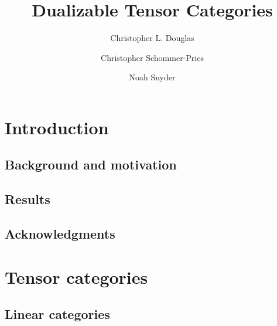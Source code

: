 \documentclass{amsart}
\begin{document}
\title{Dualizable Tensor Categories}

\begin{abstract}

\end{abstract}
	
\author{Christopher L. Douglas}
\address{Department of Mathematics, University of California, Berkeley, CA 94720, USA}
	
\author{Christopher Schommer-Pries}
\address{Department of Mathematics \\
} %

\author{Noah Snyder}
\address{}
\email{}

\maketitle	
\tableofcontents

\section{Introduction}
\subsection{Background and motivation}

\subsection{Results}

\subsection{Acknowledgments}


\section{Tensor categories}

\subsection{Linear categories}
\end{document}
